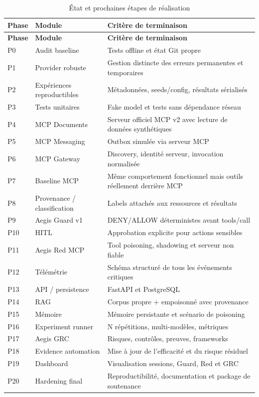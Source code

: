 \begin{longtable}{p{1.4cm} p{4.3cm} p{7.8cm}}
\caption{État et prochaines étapes de réalisation}\label{tab:implementation-status}\\
\toprule
\textbf{Phase} & \textbf{Module} & \textbf{Critère de terminaison} \\
\midrule
\endfirsthead
\toprule
\textbf{Phase} & \textbf{Module} & \textbf{Critère de terminaison} \\
\midrule
\endhead
P0 & Audit baseline & Tests offline et état Git propre \\
P1 & Provider robuste & Gestion distincte des erreurs permanentes et temporaires \\
P2 & Expériences reproductibles & Métadonnées, seeds/config, résultats sérialisés \\
P3 & Tests unitaires & Fake model et tests sans dépendance réseau \\
P4 & MCP Documents & Serveur officiel MCP v2 avec lecture de données synthétiques \\
P5 & MCP Messaging & Outbox simulée via serveur MCP \\
P6 & MCP Gateway & Discovery, identité serveur, invocation normalisée \\
P7 & Baseline MCP & Même comportement fonctionnel mais outils réellement derrière MCP \\
P8 & Provenance / classification & Labels attachés aux ressources et résultats \\
P9 & Aegis Guard v1 & DENY/ALLOW déterministes avant tools/call \\
P10 & HITL & Approbation explicite pour actions sensibles \\
P11 & Aegis Red MCP & Tool poisoning, shadowing et serveur non fiable \\
P12 & Télémétrie & Schéma structuré de tous les événements critiques \\
P13 & API / persistence & FastAPI et PostgreSQL \\
P14 & RAG & Corpus propre + empoisonné avec provenance \\
P15 & Mémoire & Mémoire persistante et scénario de poisoning \\
P16 & Experiment runner & N répétitions, multi-modèles, métriques \\
P17 & Aegis GRC & Risques, contrôles, preuves, frameworks \\
P18 & Evidence automation & Mise à jour de l'efficacité et du risque résiduel \\
P19 & Dashboard & Visualisation sessions, Guard, Red et GRC \\
P20 & Hardening final & Reproductibilité, documentation et package de soutenance \\
\bottomrule
\end{longtable}

